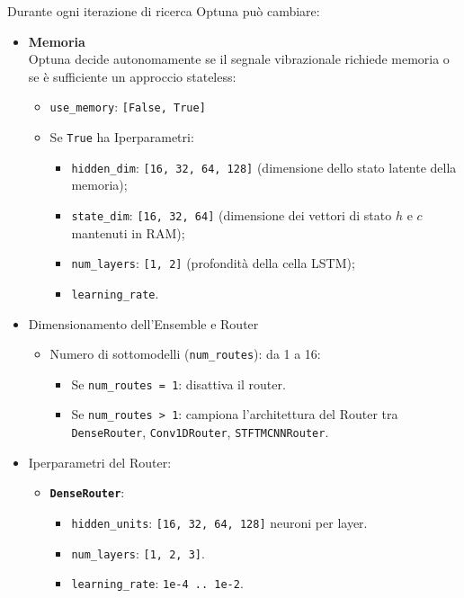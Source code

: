 Durante ogni iterazione di ricerca Optuna può cambiare:
\begin{itemize}
	\item \textbf{Memoria} \\
	Optuna decide autonomamente se il segnale vibrazionale richiede memoria o se è sufficiente un approccio stateless:
	\begin{itemize}
		\item[\(\circ\)] \texttt{use\_memory}: \texttt{[False, True]}
		\item[\(\circ\)] Se \texttt{True} ha Iperparametri:
		\begin{itemize}
			\item[\(\ast\)] \texttt{hidden\_dim}: \texttt{[16, 32, 64, 128]} (dimensione dello stato latente della memoria);
			\item[\(\ast\)] \texttt{state\_dim}: \texttt{[16, 32, 64]} (dimensione dei vettori di stato $h$ e $c$ mantenuti in RAM);
			\item[\(\ast\)] \texttt{num\_layers}: \texttt{[1, 2]} (profondità della cella LSTM);
			\item[\(\ast\)] \texttt{learning\_rate}.
		\end{itemize}
	\end{itemize}

	\item Dimensionamento dell'Ensemble e Router
	\begin{itemize}
		\item[\(\circ\)] Numero di sottomodelli (\texttt{num\_routes}): da 1 a 16:
		\begin{itemize}
			\item[\(\ast\)] Se \texttt{num\_routes = 1}: disattiva il router.
			\item[\(\ast\)] Se \texttt{num\_routes > 1}: campiona l'architettura del Router tra \texttt{DenseRouter}, \texttt{Conv1DRouter}, \texttt{STFTMCNNRouter}.
		\end{itemize}
				\end{itemize}
\item[\(\circ\)] Iperparametri del Router:
\begin{itemize}
	\item[\(\bullet\)] \textbf{\texttt{DenseRouter}}:
	\begin{itemize}
		\item[\(\ast\)] \texttt{hidden\_units}: \texttt{[16, 32, 64, 128]} neuroni per layer.
		\item[\(\ast\)] \texttt{num\_layers}: \texttt{[1, 2, 3]}.
		\item[\(\ast\)] \texttt{learning\_rate}: \texttt{1e-4 .. 1e-2}.
	\end{itemize}


\end{itemize}
\end{itemize}
